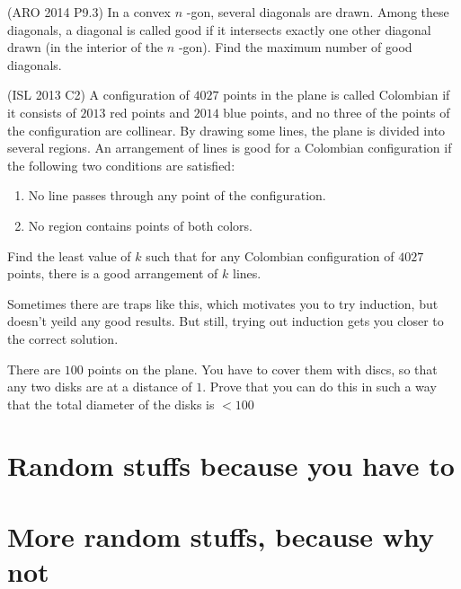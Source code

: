 \documentclass[12pt,a4paper]{article}
\begin{document}
		\begin{problem}(ARO 2014 P9.3)
			In a convex $ n $ -gon, several diagonals are drawn. Among these diagonals, a diagonal is called good if it intersects exactly one other diagonal drawn (in the interior of the $ n $ -gon). Find the maximum number of good diagonals.
		\end{problem}
	
		\begin{problem}(ISL 2013 C2)
			A configuration of $ 4027 $ points in the plane is called Colombian if it consists of $ 2013 $ red points and $ 2014 $ blue points, and no three of the points of the configuration are collinear. By drawing some lines, the plane is divided into several regions. An arrangement of lines is good for a Colombian configuration if the following two conditions are satisfied:
			\vspace{-1em}			
			\begin{enumerate}
				\item No line passes through any point of the configuration.
				\item No region contains points of both colors.
			\end{enumerate}
			\vspace{-1em}
			Find the least value of $ k $ such that for any Colombian configuration of $ 4027 $ points, there is a good arrangement of $ k $ lines.
		\end{problem}
		
		Sometimes there are traps like this, which motivates you to try induction, but doesn't yeild any good results. But still, trying out induction gets you closer to the correct solution. 
	
		\begin{problem}
			There are $ 100 $ points on the plane. You have to cover them with discs, so that any two disks are at a distance of $ 1 $. Prove that you can do this in such a way that the total diameter of the disks is $ < 100 $
		\end{problem}
		
	
	\section{Random stuffs because you have to}
	
	\section{More random stuffs, because why not}
	
\end{document}
